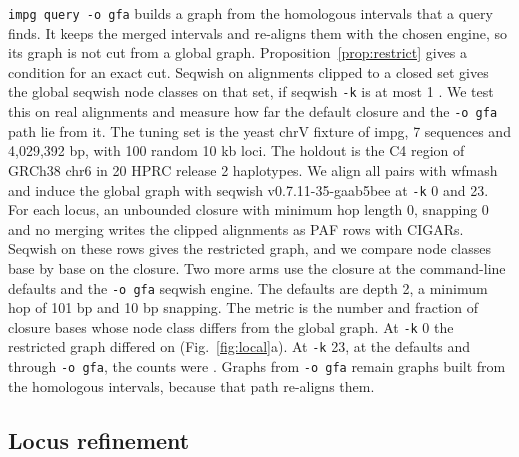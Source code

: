 \texttt{impg query -o gfa} builds a graph from the homologous intervals that a query finds.
It keeps the merged intervals and re-aligns them with the chosen engine, so its graph is not cut from a global graph.
Proposition~\ref{prop:restrict} gives a condition for an exact cut.
Seqwish on alignments clipped to a closed set gives the global seqwish node classes on that set, if seqwish \texttt{-k} is at most 1 \citep{Garrison2023seqwish}.
We test this on real alignments and measure how far the default closure and the \texttt{-o gfa} path lie from it.
The tuning set is the yeast chrV fixture of impg, 7 sequences and 4,029,392 bp, with 100 random 10 kb loci.
The holdout is the C4 region of GRCh38 chr6 in 20 HPRC release 2 haplotypes.
We align all pairs with wfmash and induce the global graph with seqwish v0.7.11-35-gaab5bee at \texttt{-k} 0 and 23.
For each locus, an unbounded closure with minimum hop length 0, snapping 0 and no merging writes the clipped alignments as PAF rows with CIGARs.
Seqwish on these rows gives the restricted graph, and we compare node classes base by base on the closure.
Two more arms use the closure at the command-line defaults and the \texttt{-o gfa} seqwish engine.
The defaults are depth 2, a minimum hop of 101 bp and 10 bp snapping.
The metric is the number and fraction of closure bases whose node class differs from the global graph.
At \texttt{-k} 0 the restricted graph differed on  (Fig.~\ref{fig:local}a).
At \texttt{-k} 23, at the defaults and through \texttt{-o gfa}, the counts were .
Graphs from \texttt{-o gfa} remain graphs built from the homologous intervals, because that path re-aligns them.

\subsection{Locus refinement}
\label{sec:res-refine}

